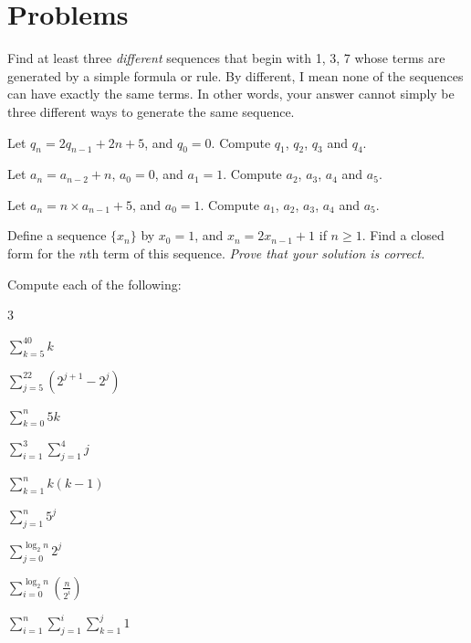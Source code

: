 \section{Problems}

\begin{pro}
Find at least three {\em different} sequences that begin with 1, 3, 7
whose terms are generated by a simple formula or rule.  
By different, I mean none of the sequences can have exactly the same terms.  In other words,
your answer cannot simply be three different ways to generate the same sequence.
\end{pro}

\begin{pro}
Let $q_n = 2 q_{n-1} + 2n + 5$, and $q_0=0$. 
Compute $q_1$, $q_2$, $q_3$ and $q_4$.
\end{pro}

\begin{pro}
Let $a_n = a_{n-2}+n$, $a_0=0$, and $a_1=1$.  
Compute $a_2$, $a_3$, $a_4$ and $a_5$.
\end{pro}

\begin{pro}
Let $a_n = n\times a_{n-1}+5$, and $a_0=1$.  
Compute $a_1$, $a_2$, $a_3$, $a_4$ and $a_5$.
\end{pro}

\begin{pro}
Define a sequence $\{x_n\}$ by $x_0=1$, and $x_n=2x_{n-1}+1$ if $n\geq 1$.
Find a closed form for the $n$th term of this sequence.
{\em Prove that your solution is correct.}
\end{pro}


\begin{pro}
Compute each of the following:
\begin{multicols}{3}
\begin{lenum}
\item ${\displaystyle\sum_{k=5}^{40}k}$
\item ${\displaystyle\sum_{j=5}^{22}(2^{j+1} - 2^j)}$
\item ${\displaystyle\sum_{k=0}^{n}5k}$
\item ${\displaystyle\sum_{i=1}^3\sum_{j=1}^4 j}$
\item ${\displaystyle\sum_{k=1}^{n}k(k-1)}$
\item ${\displaystyle\sum_{j=1}^{ n }5^j}$
\item ${\displaystyle\sum_{j=0}^{ \log_2 n}2^j}$
\item ${\displaystyle\sum_{i=0}^{\log_2 n}
\left(\frac{n}{2^i}\right)}$
\item ${\displaystyle\sum_{i=1}^n\sum_{j=1}^i \sum_{k=1}^j 1}$
\end{lenum}
\end{multicols}
\end{pro}


